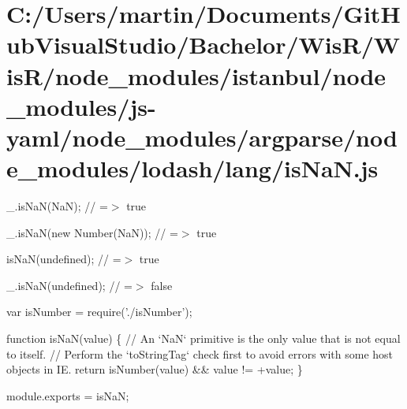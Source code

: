 \hypertarget{_c_1_2_users_2martin_2_documents_2_git_hub_visual_studio_2_bachelor_2_wis_r_2_wis_r_2node_module89fc8aa7b4534194f3e7c7c57d5f669b}{}\section{C\+:/\+Users/martin/\+Documents/\+Git\+Hub\+Visual\+Studio/\+Bachelor/\+Wis\+R/\+Wis\+R/node\+\_\+modules/istanbul/node\+\_\+modules/js-\/yaml/node\+\_\+modules/argparse/node\+\_\+modules/lodash/lang/is\+Na\+N.\+js}
\+\_\+.\+is\+Na\+N(\+Na\+N); // =$>$ true

\+\_\+.\+is\+Na\+N(new Number(\+Na\+N)); // =$>$ true

is\+Na\+N(undefined); // =$>$ true

\+\_\+.\+is\+Na\+N(undefined); // =$>$ false


\begin{DoxyCodeInclude}
var isNumber = require(\textcolor{stringliteral}{'./isNumber'});

\textcolor{keyword}{function} isNaN(value) \{
  \textcolor{comment}{// An `NaN` primitive is the only value that is not equal to itself.}
  \textcolor{comment}{// Perform the `toStringTag` check first to avoid errors with some host objects in IE.}
  \textcolor{keywordflow}{return} isNumber(value) && value != +value;
\}

module.exports = isNaN;
\end{DoxyCodeInclude}
 